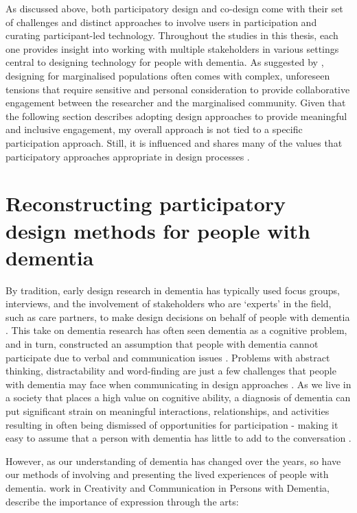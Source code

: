 As discussed above, both participatory design and co-design come with their set of challenges and distinct approaches to involve users in participation and curating participant-led technology. Throughout the studies in this thesis, each one provides insight into working with multiple stakeholders in various settings central to designing technology for people with dementia. As suggested by \cite{harrington_deconstructing_2019}, designing for marginalised populations often comes with complex, unforeseen tensions that require sensitive and personal consideration to provide collaborative engagement between the researcher and the marginalised community. Given that the following section describes adopting design approaches to provide meaningful and inclusive engagement, my overall approach is not tied to a specific participation approach. Still, it is influenced and shares many of the values that participatory approaches appropriate in design processes \citep{hansen2019participatory}.



\section{Reconstructing participatory design methods for people with dementia}
\label{method:DementiaPD}
By tradition, early design research in dementia has typically used focus groups, interviews, and the involvement of stakeholders who are `experts’ in the field, such as care partners, to make design decisions on behalf of people with dementia \citep{branco_personalised_2017}. This take on dementia research has often seen dementia as a cognitive problem, and in turn, constructed an assumption that people with dementia cannot participate due to verbal and communication issues \citep{hwang2020exploring}. Problems with abstract thinking, distractability and word-finding are just a few challenges that people with dementia may face when communicating in design approaches \citep{banovic2018communication}. As we live in a society that places a high value on cognitive ability, a diagnosis of dementia can put significant strain on meaningful interactions, relationships, and activities resulting in often being dismissed of opportunities for participation - making it easy to assume that a person with dementia has little to add to the conversation \citep{bartlett2010broadening}.

However, as our understanding of dementia has changed over the years, so have our methods of involving and presenting the lived experiences of people with dementia. \cite{john_killick_claire_craig_creativity_2012} work in Creativity and Communication in Persons with Dementia, describe the importance of expression through the arts: 

